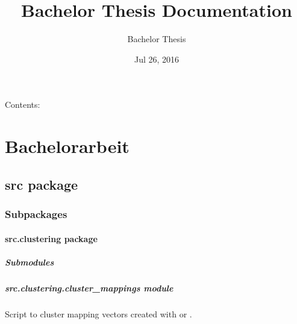 \documentclass[letterpaper,10pt,english]{sphinxmanual}
\title{Bachelor Thesis Documentation}
\date{Jul 26, 2016}
\author{Bachelor Thesis}
\begin{document}
\maketitle
\tableofcontents
{}\label{index::doc}


Contents:


\chapter{Bachelorarbeit}
\label{index:bachelorarbeit}\label{index:welcome-to-bachelor-thesis-s-documentation}

\section{src package}
\label{src::doc}\label{src:src-package}

\subsection{Subpackages}
\label{src:subpackages}

\subsubsection{src.clustering package}
\label{src.clustering:src-clustering-package}\label{src.clustering::doc}

\paragraph{Submodules}
\label{src.clustering:submodules}

\paragraph{src.clustering.cluster\_mappings module}
\label{src.clustering:module-src.clustering.cluster_mappings}\label{src.clustering:src-clustering-cluster-mappings-module}
Script to cluster mapping vectors created with {\hyperref[src.mapping:module\string-src.mapping.mapthreading]{}} or
.
\end{document}
